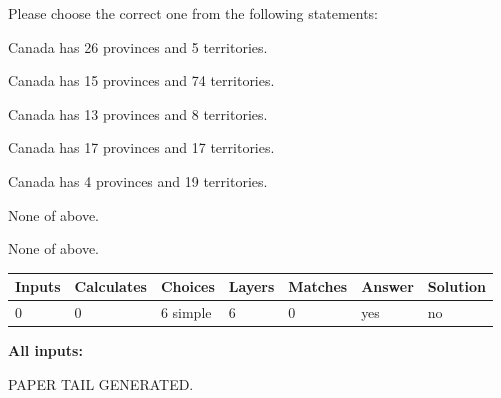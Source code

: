 \documentclass[12pt]{article}
\begin{document}
  
Please choose the correct one from the following statements:
 
 
Canada has  26 provinces and  5 territories.
 
 
Canada has  15 provinces and  74 territories.
 
 
Canada has  13 provinces and  8 territories.
 
 
Canada has  17 provinces and  17 territories.
 
 
Canada has   4 provinces and  19 territories.
 
 
 None of above.
 
 
\noindent{}
 
 
 None of above.
 
 
\noindent{}
 
 
   
   
   
   
\noindent\begin{tabular}{|l|l|l|l|l|l|l|}
 \hline
Inputs & Calculates & Choices & Layers & Matches & Answer & Solution \\ \hline
 0  & 
 0  & 
 6
  simple  
  & 
 6  & 
 0  & 
  yes & 
  no 
  \\ \hline
 \end{tabular}
   
   
   
   
\noindent{}
   
   
   
   
\noindent\vspace{0.1in}\hspace{-0.08in} {\textbf{\Large{All inputs: }}}
   
   
   
   
   
   
 \vspace{0.2in}
 
   
   
\vspace{2.0in} PAPER TAIL GENERATED.
   
   
   
\end{document}
